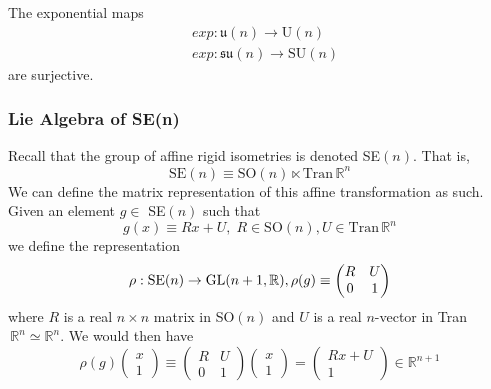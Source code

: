     \begin{theorem}
    The exponential maps 
    \begin{align*}
      & exp: \mathfrak{u}(n) \rightarrow \text{U}(n) \\
      & exp: \mathfrak{su}(n) \rightarrow \text{SU}(n)
    \end{align*}
    are surjective. 
    \end{theorem}

  \subsubsection{Lie Algebra of SE(n)}

    Recall that the group of affine rigid isometries is denoted SE$(n)$. That is, 
    \begin{equation}
      \text{SE}(n) \equiv \text{SO}(n) \ltimes \text{Tran}\,\mathbb{R}^n
    \end{equation}
    We can define the matrix representation of this affine transformation as such. Given an element $g \in$ SE$(n)$ such that
    \begin{equation}
      g(x) \equiv R x + U, \; R \in \text{SO}(n), U \in \text{Tran}\, \mathbb{R}^n 
    \end{equation}
    we define the representation
    \begin{equation}
      \rho: \text{SE}(n) \rightarrow \operatorname{GL}(n+1, \mathbb{R}), \rho(g) \equiv \begin{pmatrix}
      R&U\\0&1
      \end{pmatrix}
    \end{equation}
    where $R$ is a real $n\times n$ matrix in SO$(n)$ and $U$ is a real $n$-vector in Tran$\,\mathbb{R}^n \simeq \mathbb{R}^n$. We would then have
    \begin{equation}
      \rho(g) \begin{pmatrix}
      x\\1
      \end{pmatrix} \equiv \begin{pmatrix}
      R&U\\0&1
      \end{pmatrix} \begin{pmatrix}
      x\\1
      \end{pmatrix} = \begin{pmatrix}
      R x + U\\1
      \end{pmatrix} \in \mathbb{R}^{n+1}
    \end{equation}

